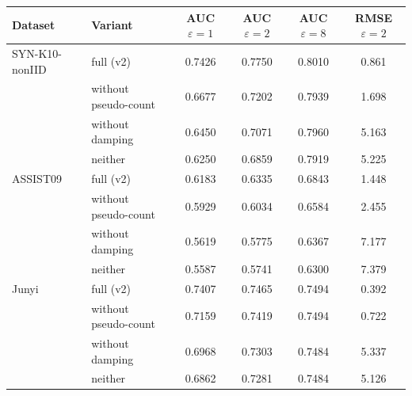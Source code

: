 \begin{widetable}
\centering
\caption{Exploratory ablation of DP-FED (not part of the frozen protocol): test AUC at three privacy levels and difficulty RMSE at $\varepsilon=2$ (against truth for synthetic data, against CEN for real logs), mean over seeds, frozen hyper-parameters.}
\label{tab:ablation}
\small
\begin{tabular}{llcccc}
\toprule
Dataset & Variant & AUC $\varepsilon{=}1$ & AUC $\varepsilon{=}2$ & AUC $\varepsilon{=}8$ & RMSE $\varepsilon{=}2$ \\
\midrule
SYN-K10-nonIID & full (v2) & 0.7426 & 0.7750 & 0.8010 & 0.861 \\
 & without pseudo-count & 0.6677 & 0.7202 & 0.7939 & 1.698 \\
 & without damping & 0.6450 & 0.7071 & 0.7960 & 5.163 \\
 & neither & 0.6250 & 0.6859 & 0.7919 & 5.225 \\
\midrule
ASSIST09 & full (v2) & 0.6183 & 0.6335 & 0.6843 & 1.448 \\
 & without pseudo-count & 0.5929 & 0.6034 & 0.6584 & 2.455 \\
 & without damping & 0.5619 & 0.5775 & 0.6367 & 7.177 \\
 & neither & 0.5587 & 0.5741 & 0.6300 & 7.379 \\
\midrule
Junyi & full (v2) & 0.7407 & 0.7465 & 0.7494 & 0.392 \\
 & without pseudo-count & 0.7159 & 0.7419 & 0.7494 & 0.722 \\
 & without damping & 0.6968 & 0.7303 & 0.7484 & 5.337 \\
 & neither & 0.6862 & 0.7281 & 0.7484 & 5.126 \\
\bottomrule
\end{tabular}
\end{widetable}
